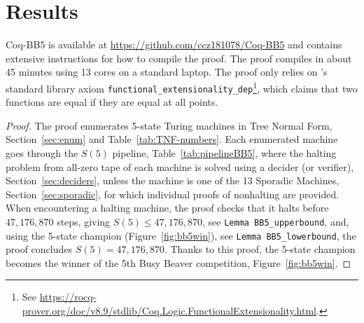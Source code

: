 \documentclass[sigconf,screen]{acmart}
\theoremstyle{definition} %
\numberwithin{equation}{section}
\theoremstyle{definition} %
\newcommand{\numSporadic}{13\xspace}
\newcommand{\CoqBB}{Coq-BB5\xspace}
\begin{document}





% 

\newpage




\newpage


\newpage
\section{Results}\label{sec:results}

\CoqBB is available at \url{https://github.com/ccz181078/Coq-BB5} \cite{mxdys_2025_17061968} and contains extensive instructions for how to compile the proof. The proof compiles in about 45 minutes using 13 cores on a standard laptop. The proof only relies on \Coq's standard library axiom \texttt{functional\_extensionality\_dep}\footnote{See \url{https://rocq-prover.org/doc/v8.9/stdlib/Coq.Logic.FunctionalExtensionality.html}.}, which claims that two functions are equal if they are equal at all points.

\thBBTheFifth*
\begin{proof}
    The \Coq proof enumerates 5-state Turing machines in Tree Normal Form, Section~\ref{sec:enum} and Table~\ref{tab:TNF-numbers}. Each enumerated machine goes through the $S(5)$ pipeline, Table~\ref{tab:pipelineBB5}, where the halting problem from all-zero tape of each machine is solved using a decider (or verifier), Section~\ref{sec:deciders}, unless the machine is one of the \numSporadic Sporadic Machines, Section~\ref{sec:sporadic}, for which individual \Coq proofs of nonhalting are provided.
    When encountering a halting machine, the proof checks that it halts before $47{,}176{,}870$ steps, giving $S(5) \leq 47{,}176{,}870$, see \texttt{Lemma BB5\_upperbound}, and, using the 5-state champion (Figure~\ref{fig:bb5win}), see \texttt{Lemma BB5\_lowerbound}, the proof concludes $S(5) = 47{,}176{,}870$. Thanks to this proof, the 5-state champion becomes the winner of the 5th Busy Beaver competition, Figure~\ref{fig:bb5win}.
\end{proof}
\end{document}
